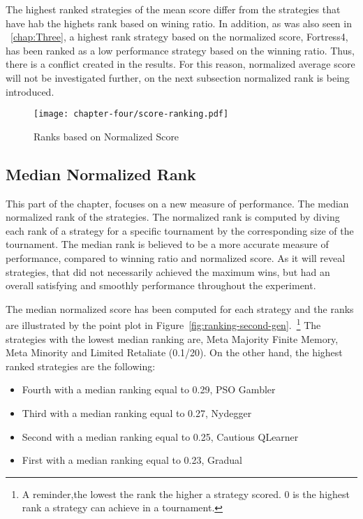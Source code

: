 The highest ranked strategies of the mean score differ from the strategies that
have hab the highets rank based on wining ratio. In addition, as was also seen
in ~\autoref{chap:Three}, a highest rank strategy based on the normalized score,
Fortress4, has been ranked as a low performance strategy based on the winning ratio.
Thus, there is a conflict created in the results. For this reason, normalized
average score will not be investigated further, on the next subsection normalized
rank is being introduced.

\begin{figure}[H]
	\texttt{[image: chapter-four/score-ranking.pdf]}
	\caption{Ranks based on Normalized Score}
	\label{fig:wining-second-gen}
\end{figure}

\subsection{Median Normalized Rank}

This part of the chapter, focuses on a new measure of performance. The
median normalized rank of the strategies. The normalized rank is computed
by diving each rank of a strategy for a specific tournament by the corresponding
size of the tournament. The median rank is believed to be a more accurate
measure of performance, compared to winning ratio and normalized score.
As it will reveal strategies, that did not necessarily achieved the maximum wins,
but had an overall satisfying and smoothly performance throughout the experiment.

The median normalized score has been computed for each strategy and the ranks
are illustrated by the point plot in Figure~\ref{fig:ranking-second-gen}.~\footnote{A reminder,the
	lowest the rank the higher a strategy scored. 0 is the highest rank a strategy
can achieve in a tournament.} The strategies with the lowest median ranking are,
Meta Majority Finite Memory, Meta Minority and Limited Retaliate (0.1/20).
On the other hand, the highest ranked strategies are the following:

\begin{itemize}
	\item Fourth with a median ranking equal to 0.29, PSO Gambler
	\item Third with a median ranking equal to 0.27, Nydegger
	\item Second with a median ranking equal to 0.25, Cautious QLearner
	\item First with a median ranking equal to 0.23, Gradual
\end{itemize}

